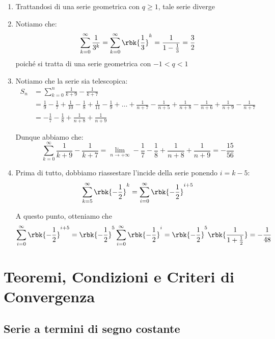 \documentclass[a4paper, 12pt]{report}
\begin{document}
    \begin{enumerate}
        \item Trattandosi di una serie geometrica con $q \geq 1$, tale serie diverge
        
        \item Notiamo che:
        \[\sum\limits_{k = 0}^{\infty} \frac{1}{3^k} = \sum\limits_{k = 0}^{\infty} \rbk{\frac{1}{3}}^k = \dfrac{1}{1-\frac{1}{3}} = \dfrac{3}{2}\]
        poiché si tratta di una serie geometrica con $-1 < q < 1$
        
        \item Notiamo che la serie sia telescopica:
        \[\begin{split}
            S_n &= \sum\limits_{k = 0}^{n} \frac{1}{k+9} - \frac{1}{k+7} \\
            &= \frac{1}{9} - \frac{1}{7} + \frac{1}{10} - \frac{1}{8} + \frac{1}{11} - \frac{1}{9} + \ldots + \frac{1}{n+7} - \frac{1}{n+5} + \frac{1}{n+8} - \frac{1}{n+6} + \frac{1}{n+9} - \frac{1}{n+7} \\
            &= - \frac{1}{7} - \frac{1}{8} + \frac{1}{n+8} + \frac{1}{n+9}
        \end{split}\]

        Dunque abbiamo che:
        \[\sum\limits_{k = 0}^{\infty} \dfrac{1}{k+9} - \dfrac{1}{k+7} = \lim_{n \to +\infty} - \frac{1}{7} - \frac{1}{8} + \frac{1}{n+8} + \frac{1}{n+9} = -\frac{15}{56}\]
        
        \item Prima di tutto, dobbiamo riassestare l'incide della serie ponendo $i = k-5$:
        \[\sum\limits_{k = 5}^{\infty} \rbk{-\dfrac{1}{2}}^k = \sum\limits_{i = 0}^{\infty} \rbk{-\dfrac{1}{2}}^{i+5}\]

        A questo punto, otteniamo che
        \[\sum\limits_{i = 0}^{\infty} \rbk{-\dfrac{1}{2}}^{i+5} = \rbk{-\frac{1}{2}}^5 \sum\limits_{i = 0}^{\infty} \rbk{-\dfrac{1}{2}}^{i} = \rbk{-\frac{1}{2}}^5 \rbk{\frac{1}{1+\frac{1}{2}}} = -\frac{1}{48}\]

    \end{enumerate}

    \section{Teoremi, Condizioni e Criteri di Convergenza}

    \subsection{Serie a termini di segno costante}
    
\end{document}
